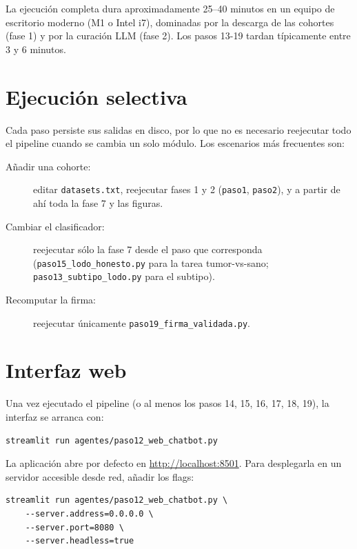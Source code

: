 La ejecución completa dura aproximadamente 25--40 minutos en un equipo
de escritorio moderno (M1 o Intel i7), dominadas por la descarga de las
cohortes (fase 1) y por la curación LLM (fase 2). Los pasos 13-19
tardan típicamente entre 3 y 6 minutos.

\section*{Ejecución selectiva}
{}

Cada paso persiste sus salidas en disco, por lo que no es necesario
reejecutar todo el pipeline cuando se cambia un solo módulo. Los
escenarios más frecuentes son:

\begin{description}
  \item[Añadir una cohorte:] editar \texttt{datasets.txt}, reejecutar
  fases 1 y 2 (\texttt{paso1}, \texttt{paso2}), y a partir de ahí toda
  la fase 7 y las figuras.
  \item[Cambiar el clasificador:] reejecutar sólo la fase 7 desde el
  paso que corresponda (\texttt{paso15\_lodo\_honesto.py} para la tarea
  tumor-vs-sano; \texttt{paso13\_subtipo\_lodo.py} para el subtipo).
  \item[Recomputar la firma:] reejecutar únicamente
  \texttt{paso19\_firma\_validada.py}.
\end{description}

\section*{Interfaz web}
{}

Una vez ejecutado el pipeline (o al menos los pasos 14, 15, 16, 17, 18,
19), la interfaz se arranca con:

\begin{lstlisting}[style=bash, caption={Arranque de la interfaz.}]
streamlit run agentes/paso12_web_chatbot.py
\end{lstlisting}

La aplicación abre por defecto en \url{http://localhost:8501}. Para
desplegarla en un servidor accesible desde red, añadir los flags:

\begin{lstlisting}[style=bash]
streamlit run agentes/paso12_web_chatbot.py \
    --server.address=0.0.0.0 \
    --server.port=8080 \
    --server.headless=true
\end{lstlisting}

